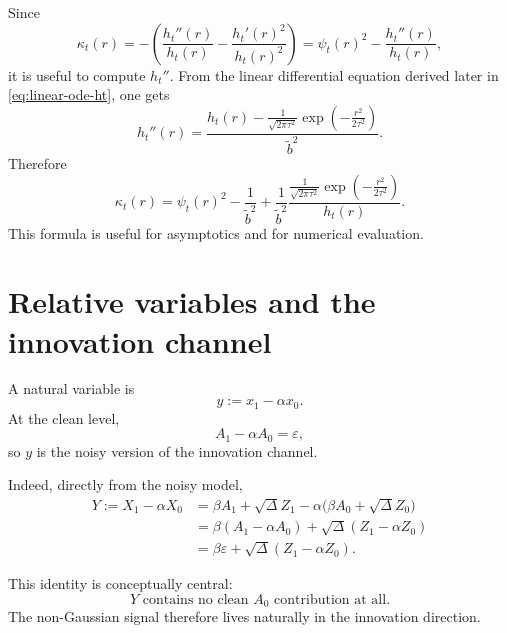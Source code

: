 \documentclass[11pt]{article}
\newcommand{\1}{\mathbf{1}}
\newcommand{\gauss}[2]{\frac{1}{\sqrt{2\pi #2}}\exp\!\left(-\frac{#1^2}{2#2}\right)}
\theoremstyle{definition}
\begin{document}
Since
\begin{equation}
\kappa_t(r)= -\left(\frac{h_t''(r)}{h_t(r)} - \frac{h_t'(r)^2}{h_t(r)^2}\right)
= \psi_t(r)^2 - \frac{h_t''(r)}{h_t(r)},
\end{equation}
it is useful to compute \(h_t''\). From the linear differential equation derived later in \eqref{eq:linear-ode-ht}, one gets
\begin{equation}
h_t''(r)=\frac{h_t(r)-\gauss{r}{\tau^2}}{\tilde b^2}.
\end{equation}
Therefore
\begin{equation}
\label{eq:kappa-explicit}
\boxed{
\kappa_t(r)=\psi_t(r)^2-\frac{1}{\tilde b^2}+\frac{1}{\tilde b^2}\frac{\gauss{r}{\tau^2}}{h_t(r)}.
}
\end{equation}
This formula is useful for asymptotics and for numerical evaluation.

\section{Relative variables and the innovation channel}

A natural variable is
\begin{equation}
\label{eq:y-definition}
y:=x_1-\alpha x_0.
\end{equation}
At the clean level,
\begin{equation}
A_1-\alpha A_0 = \varepsilon,
\end{equation}
so \(y\) is the noisy version of the innovation channel.

Indeed, directly from the noisy model,
\begin{align}
Y := X_1-\alpha X_0
&= \beta A_1 + \sqrt{\Delta}Z_1 - \alpha\big(\beta A_0 + \sqrt{\Delta}Z_0\big) \\
&= \beta(A_1-\alpha A_0)+\sqrt{\Delta}(Z_1-\alpha Z_0) \\
&= \beta\varepsilon + \sqrt{\Delta}(Z_1-\alpha Z_0).
\end{align}

This identity is conceptually central:
\begin{equation}
\boxed{Y \text{ contains no clean } A_0 \text{ contribution at all.}}
\end{equation}
The non-Gaussian signal therefore lives naturally in the innovation direction.
\end{document}
